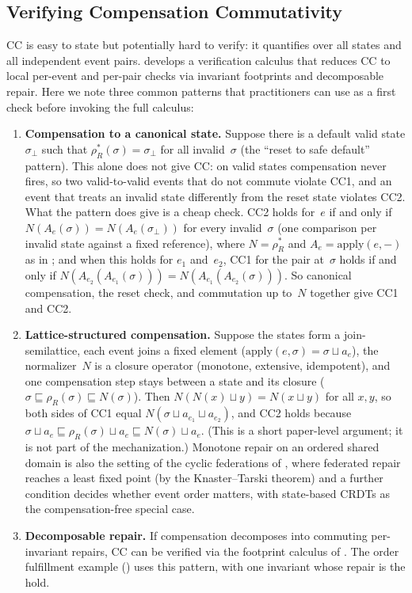 \documentclass[11pt,a4paper]{article}
\theoremstyle{plain}
\theoremstyle{definition}
\theoremstyle{remark}
\renewcommand{\_}{\textunderscore\allowbreak}
\begin{document}
\subsection{Verifying Compensation Commutativity}
\label{sec:verify-cc}

CC is easy to state but potentially hard to verify: it quantifies over all
states and all independent event pairs.   develops a
verification calculus that reduces CC to local per-event and per-pair checks
via invariant footprints and decomposable repair.  Here we note three common
patterns that practitioners can use as a first check before invoking the full
calculus:

\begin{enumerate}[leftmargin=*,nosep]
\item \textbf{Compensation to a canonical state.}\;  Suppose there is a
  default valid state $\sigma_\bot$ such that $\rho_R^*(\sigma) = \sigma_\bot$
  for all invalid~$\sigma$ (the ``reset to safe default'' pattern).  This
  alone does not give CC: on valid states compensation never fires, so two
  valid-to-valid events that do not commute violate CC1, and an event that
  treats an invalid state differently from the reset state violates CC2.
  What the pattern does give is a cheap check.  CC2 holds for~$e$ if and only
  if $N(A_e(\sigma)) = N(A_e(\sigma_\bot))$ for every invalid~$\sigma$ (one
  comparison per invalid state against a fixed reference), where
  $N = \rho_R^*$ and $A_e = \mathrm{apply}(e, -)$ as in
  ; and when this holds for $e_1$ and~$e_2$, CC1 for the
  pair at~$\sigma$ holds if and only if
  $N(A_{e_2}(A_{e_1}(\sigma))) = N(A_{e_1}(A_{e_2}(\sigma)))$.  So canonical
  compensation, the reset check, and commutation up to~$N$ together give CC1
  and CC2.
\item \textbf{Lattice-structured compensation.}\;  Suppose the states form a
  join-semilattice, each event joins a fixed element
  ($\mathrm{apply}(e, \sigma) = \sigma \sqcup a_e$), the normalizer~$N$ is a
  closure operator (monotone, extensive, idempotent), and one compensation
  step stays between a state and its closure
  ($\sigma \sqsubseteq \rho_R(\sigma) \sqsubseteq N(\sigma)$).  Then
  $N(N(x) \sqcup y) = N(x \sqcup y)$ for all $x, y$, so both sides of CC1
  equal $N(\sigma \sqcup a_{e_1} \sqcup a_{e_2})$, and CC2 holds because
  $\sigma \sqcup a_e \sqsubseteq \rho_R(\sigma) \sqcup a_e \sqsubseteq
  N(\sigma) \sqcup a_e$.  (This is a short paper-level argument; it is not
  part of the mechanization.)  Monotone repair on an ordered shared domain is
  also the setting of the cyclic federations of , where federated repair reaches a least fixed point (by
  the Knaster--Tarski theorem) and a further condition decides whether event
  order matters, with state-based CRDTs as the compensation-free special case.
\item \textbf{Decomposable repair.}\;  If compensation decomposes into
  commuting per-invariant repairs, CC can be verified via the footprint
  calculus of .  The order fulfillment example
  () uses this pattern, with one invariant whose repair is
  the hold.
\end{enumerate}
\end{document}
